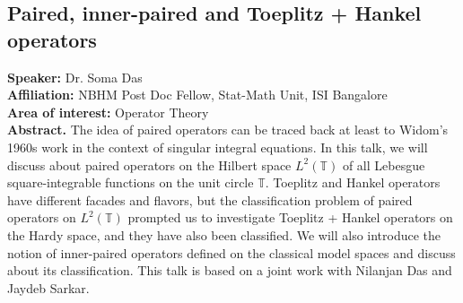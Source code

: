 \subsection*{Paired, inner-paired and Toeplitz + Hankel operators} %
\noindent
\textbf{Speaker:} Dr. Soma Das \\ %
\textbf{Affiliation:} NBHM Post Doc Fellow, Stat-Math Unit, ISI Bangalore\\ 
\textbf{Area of interest:} Operator Theory \\%

\noindent\textbf{Abstract.} The idea of paired operators can be traced back at least to Widom's 1960s work in the context of singular integral equations. In this talk, we will discuss about paired operators on the Hilbert space $L^2(\mathbb{T})$ of all Lebesgue square-integrable functions on the unit circle $\mathbb{T}$. Toeplitz and Hankel operators have different facades and flavors, but the classification problem of paired operators on $L^2(\mathbb{T})$ prompted us to investigate Toeplitz + Hankel operators on the Hardy space, and they have also been classified. We will also introduce the notion of inner-paired operators defined on the classical model spaces and discuss about its classification. This talk is based on a joint work with Nilanjan Das and Jaydeb Sarkar.


